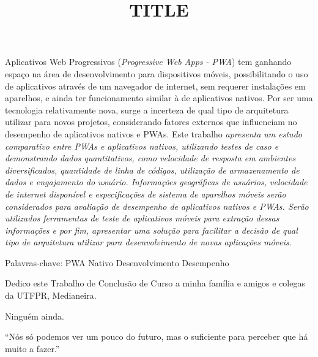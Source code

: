 \documentclass[oneside]{normas-utf-tex} %
\title{\MakeUppercase{TITLE}} %
\begin{document}
\capa %
\folhaderosto %

\termodeaprovacao

\begin{resumo}

Aplicativos Web Progressivos (\textit{Progressive Web Apps - PWA}) tem ganhando espaço na área de desenvolvimento para dispositivos móveis, possibilitando o uso de aplicativos através de um navegador de internet, sem requerer instalações em aparelhos, e ainda ter funcionamento similar à de aplicativos nativos. Por ser uma tecnologia relativamente nova, surge a incerteza de qual tipo de arquitetura utilizar para novos projetos, considerando fatores externos que influenciam no desempenho de aplicativos nativos e PWAs. Este trabalho \textit{apresenta um estudo comparativo entre PWAs e  aplicativos nativos, utilizando testes de caso e demonstrando dados quantitativos, como velocidade de resposta em ambientes diversificados, quantidade de linha de códigos, utilização de armazenamento de dados e engajamento do usuário. Informações geográficas de usuários, velocidade de internet disponível e especificações de sistema de aparelhos móveis serão considerados para avaliação de desempenho de aplicativos nativos e PWAs. Serão utilizados ferramentas de teste de aplicativos móveis para extração dessas informações e por fim, apresentar uma solução para facilitar a decisão de qual tipo de arquitetura utilizar para desenvolvimento de novas aplicações móveis.}

Palavras-chave: PWA Nativo Desenvolvimento Desempenho

\end{resumo}

\begin{abstract}


\end{abstract}


\begin{dedicatoria}
Dedico este Trabalho de Conclusão de Curso a minha família e amigos e colegas da UTFPR, Medianeira.
\end{dedicatoria}

\begin{agradecimentos}
Ninguém ainda.
\end{agradecimentos}
\begin{epigrafe}
“Nós só podemos ver um pouco do futuro, mas o suficiente para perceber que há muito a fazer.”
\end{epigrafe}
\end{document}
